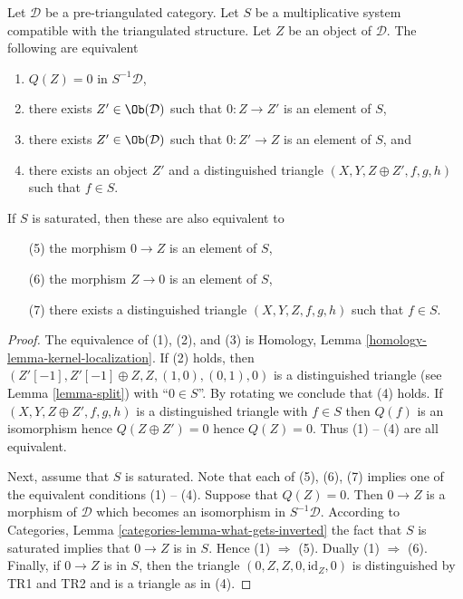 \begin{lemma}
\label{lemma-kernel-localization}
Let $\mathcal{D}$ be a pre-triangulated category. Let $S$ be a multiplicative
system compatible with the triangulated structure. Let $Z$ be an object
of $\mathcal{D}$. The following are equivalent
\begin{enumerate}
\item $Q(Z) = 0$ in $S^{-1}\mathcal{D}$,
\item there exists $Z' \in \Ob(\mathcal{D})$ such that
$0 : Z \to Z'$ is an element of $S$,
\item there exists $Z' \in \Ob(\mathcal{D})$ such that
$0 : Z' \to Z$ is an element of $S$, and
\item there exists an object $Z'$ and a distinguished triangle
$(X, Y, Z \oplus Z', f, g, h)$ such that $f \in S$.
\end{enumerate}
If $S$ is saturated, then these are also equivalent to
\begin{enumerate}
\item[(5)] the morphism $0 \to Z$ is an element of $S$,
\item[(6)] the morphism $Z \to 0$ is an element of $S$,
\item[(7)] there exists a distinguished triangle $(X, Y, Z, f, g, h)$
such that $f \in S$.
\end{enumerate}
\end{lemma}

\begin{proof}
The equivalence of (1), (2), and (3) is
Homology, Lemma \ref{homology-lemma-kernel-localization}.
If (2) holds, then $(Z'[-1], Z'[-1] \oplus Z, Z, (1, 0), (0, 1), 0)$
is a distinguished triangle (see
Lemma \ref{lemma-split})
with ``$0 \in S$''. By rotating we conclude that (4) holds.
If $(X, Y, Z \oplus Z', f, g, h)$ is a distinguished triangle with $f \in S$
then $Q(f)$ is an isomorphism hence $Q(Z \oplus Z') = 0$ hence $Q(Z) = 0$.
Thus (1) -- (4) are all equivalent.

\medskip\noindent
Next, assume that $S$ is saturated. Note that each of (5), (6), (7)
implies one of the equivalent conditions (1) -- (4). Suppose that
$Q(Z) = 0$. Then $0 \to Z$ is a morphism of $\mathcal{D}$ which becomes
an isomorphism in $S^{-1}\mathcal{D}$. According to
Categories, Lemma \ref{categories-lemma-what-gets-inverted}
the fact that $S$ is saturated implies that $0 \to Z$ is in $S$.
Hence (1) $\Rightarrow$ (5). Dually (1) $\Rightarrow$ (6).
Finally, if $0 \to Z$ is in $S$, then the triangle
$(0, Z, Z, 0, \text{id}_Z, 0)$ is distinguished by TR1 and TR2 and
is a triangle as in (4).
\end{proof}

